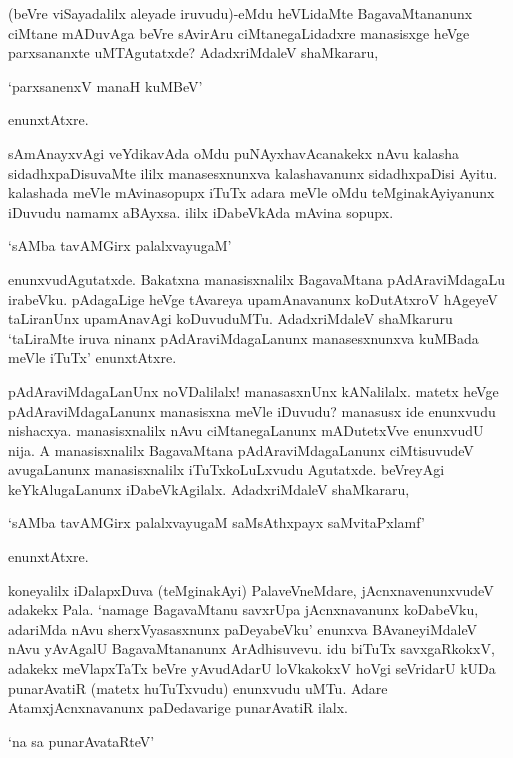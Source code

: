 (beVre viSayadalilx aleyade iruvudu)-eMdu heVLidaMte BagavaMtananunx ciMtane mADuvAga beVre sAvirAru ciMtanegaLidadxre manasisxge heVge parxsananxte uMTAgutatxde? AdadxriMdaleV shaMkararu,

\begin{shloka}
`parxsanenxV manaH kuMBeV'
\end{shloka}

enunxtAtxre.

sAmAnayxvAgi veYdikavAda oMdu puNAyxhavAcanakekx nAvu kalasha sidadhxpaDisuvaMte ililx manasesxnunxva kalashavanunx sidadhxpaDisi Ayitu. kalashada meVle mAvinasopupx iTuTx adara meVle oMdu teMginakAyiyanunx iDuvudu namamx aBAyxsa. ililx iDabeVkAda mAvina sopupx.

\begin{shloka}
`sAMba tavAMGirx palalxvayugaM'
\end{shloka}

\noindent enunxvudAgutatxde. Bakatxna manasisxnalilx BagavaMtana pAdAraviMdagaLu irabeVku. pAdagaLige heVge tAvareya upamAnavanunx koDutAtxroV hAgeyeV taLiranUnx upamAnavAgi koDuvuduMTu. AdadxriMdaleV shaMkaruru `taLiraMte iruva ninanx pAdAraviMdagaLanunx manasesxnunxva kuMBada meVle iTuTx' enunxtAtxre.

pAdAraviMdagaLanUnx noVDalilalx! manasasxnUnx kANalilalx. matetx heVge pAdAraviMdagaLanunx manasisxna meVle iDuvudu? manasusx ide enunxvudu nishacxya. manasisxnalilx nAvu ciMtanegaLanunx mADutetxVve enunxvudU nija. A manasisxnalilx BagavaMtana pAdAraviMdagaLanunx ciMtisuvudeV avugaLanunx manasisxnalilx iTuTxkoLuLxvudu Agutatxde. beVreyAgi keYkAlugaLanunx iDabeVkAgilalx. AdadxriMdaleV shaMkararu,

\begin{shloka}
`sAMba tavAMGirx palalxvayugaM saMsAthxpayx saMvitaPxlamf'
\end{shloka}

enunxtAtxre.

koneyalilx iDalapxDuva (teMginakAyi) PalaveVneMdare, jAcnxnavenunxvudeV adakekx Pala. `namage BagavaMtanu savxrUpa jAcnxnavanunx koDabeVku, adariMda nAvu sherxVyasasxnunx paDeyabeVku' enunxva BAvaneyiMdaleV nAvu yAvAgalU BagavaMtananunx ArAdhisuvevu. idu biTuTx savxgaRkokxV, adakekx meVlapxTaTx beVre yAvudAdarU loVkakokxV hoVgi seVridarU kUDa punarAvatiR (matetx huTuTxvudu) enunxvudu uMTu. Adare AtamxjAcnxnavanunx paDedavarige punarAvatiR ilalx. 

\begin{shloka}
`na sa punarAvataRteV'
\end{shloka}

